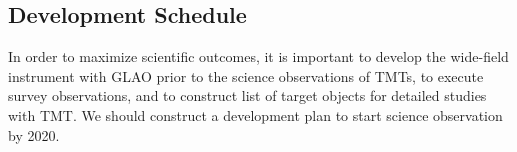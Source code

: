 \subsection{Development Schedule}

In order to maximize scientific outcomes, it is important to develop
the wide-field instrument with GLAO prior to the science observations of
TMTs, to execute survey observations, and to construct list of target
objects for detailed studies with TMT. We should construct a development
plan to start science observation by 2020.

